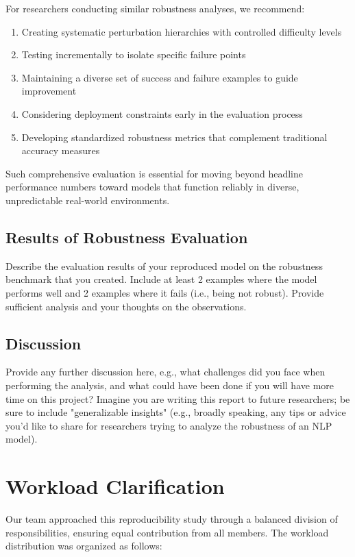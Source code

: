 \documentclass[11pt,a4paper]{article}
\begin{document}
For researchers conducting similar robustness analyses, we recommend:
\begin{enumerate}
    \item Creating systematic perturbation hierarchies with controlled difficulty levels
    \item Testing incrementally to isolate specific failure points
    \item Maintaining a diverse set of success and failure examples to guide improvement
    \item Considering deployment constraints early in the evaluation process
    \item Developing standardized robustness metrics that complement traditional accuracy measures
\end{enumerate}

Such comprehensive evaluation is essential for moving beyond headline performance numbers toward models that function reliably in diverse, unpredictable real-world environments.

\subsection{Results of Robustness Evaluation}
Describe the evaluation results of your reproduced model on the robustness benchmark that you created. Include at least 2 examples where the model performs well and 2 examples where it fails (i.e., being not robust). Provide sufficient analysis and your thoughts on the observations.

\subsection{Discussion} 
Provide any further discussion here, e.g., what challenges did you face when performing the analysis, and what could have been done if you will have more time on this project? Imagine you are writing this report to future researchers; be sure to include "generalizable insights" (e.g., broadly speaking, any tips or advice you'd like to share for researchers trying to analyze the robustness of an NLP model).

\section{Workload Clarification}

Our team approached this reproducibility study through a balanced division of responsibilities, ensuring equal contribution from all members. The workload distribution was organized as follows:
\end{document}
